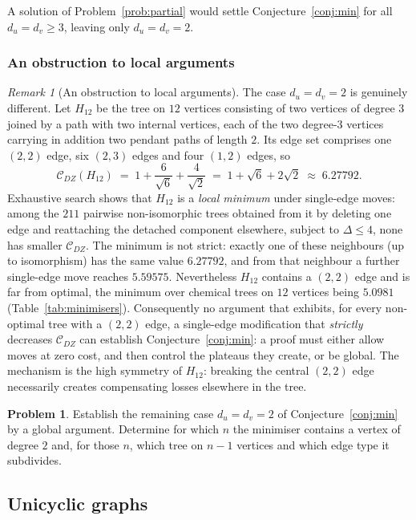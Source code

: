 \documentclass[11pt,a4paper]{article}
\theoremstyle{plain}
\theoremstyle{definition}
\newtheorem{problem}[theorem]{Problem}
\theoremstyle{remark}
\newtheorem{remark}[theorem]{Remark}
\newcommand{\CDZ}{\mathcal{C}_{DZ}}
\begin{document}
A solution of Problem~\ref{prob:partial} would settle Conjecture~\ref{conj:min}
for all $d_u=d_v\ge3$, leaving only $d_u=d_v=2$.

\subsubsection{An obstruction to local arguments}

\begin{remark}[An obstruction to local arguments]
\label{rem:obstruction}
The case $d_u=d_v=2$ is genuinely different. Let $H_{12}$ be the tree on $12$ vertices
consisting of two vertices of degree $3$ joined by a path with two internal
vertices, each of the two degree-$3$ vertices carrying in addition two pendant
paths of length $2$. Its edge set comprises one $(2,2)$ edge, six $(2,3)$ edges
and four $(1,2)$ edges, so
\[
  \CDZ(H_{12})\;=\;1+\frac{6}{\sqrt6}+\frac{4}{\sqrt2}
  \;=\;1+\sqrt6+2\sqrt2\;\approx\;6.27792 .
\]
Exhaustive search shows that $H_{12}$ is a \emph{local minimum} under
single-edge moves: among the $211$ pairwise non-isomorphic trees obtained from it
by deleting one edge and reattaching the detached component elsewhere, subject
to $\Delta\le4$, none has smaller $\CDZ$. The minimum is not strict: exactly one
of these neighbours (up to isomorphism) has the same value $6.27792$, and from
that neighbour a further single-edge move reaches $5.59575$. Nevertheless
$H_{12}$ contains a $(2,2)$ edge and is far from optimal, the minimum over
chemical trees on $12$ vertices being $5.0981$ (Table~\ref{tab:minimisers}).
Consequently no argument that exhibits, for every non-optimal tree with a
$(2,2)$ edge, a single-edge modification that \emph{strictly} decreases $\CDZ$
can establish Conjecture~\ref{conj:min}: a proof must either allow moves at zero
cost, and then control the plateaus they create, or be global. The mechanism is
the high symmetry of $H_{12}$: breaking the central $(2,2)$ edge necessarily
creates compensating losses elsewhere in the tree.
\end{remark}

\begin{problem}
\label{prob:global}
Establish the remaining case $d_u=d_v=2$ of Conjecture~\ref{conj:min} by a global
argument. Determine for which $n$ the minimiser contains a vertex of degree $2$
and, for those $n$, which tree on $n-1$ vertices and which edge type it
subdivides.
\end{problem}

\subsection{Unicyclic graphs}
\end{document}
